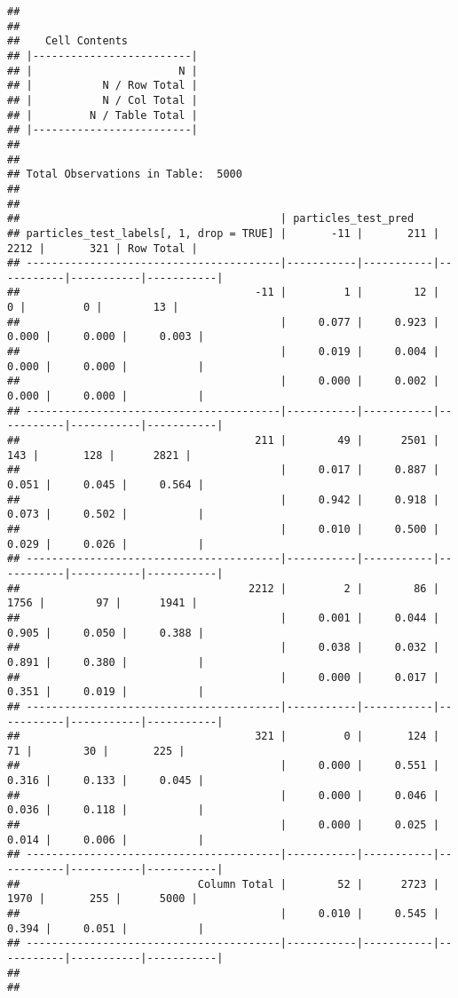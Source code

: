 \documentclass[
]{article}
\begin{document}
\begin{verbatim}
## 
##  
##    Cell Contents
## |-------------------------|
## |                       N |
## |           N / Row Total |
## |           N / Col Total |
## |         N / Table Total |
## |-------------------------|
## 
##  
## Total Observations in Table:  5000 
## 
##  
##                                         | particles_test_pred 
## particles_test_labels[, 1, drop = TRUE] |       -11 |       211 |      2212 |       321 | Row Total | 
## ----------------------------------------|-----------|-----------|-----------|-----------|-----------|
##                                     -11 |         1 |        12 |         0 |         0 |        13 | 
##                                         |     0.077 |     0.923 |     0.000 |     0.000 |     0.003 | 
##                                         |     0.019 |     0.004 |     0.000 |     0.000 |           | 
##                                         |     0.000 |     0.002 |     0.000 |     0.000 |           | 
## ----------------------------------------|-----------|-----------|-----------|-----------|-----------|
##                                     211 |        49 |      2501 |       143 |       128 |      2821 | 
##                                         |     0.017 |     0.887 |     0.051 |     0.045 |     0.564 | 
##                                         |     0.942 |     0.918 |     0.073 |     0.502 |           | 
##                                         |     0.010 |     0.500 |     0.029 |     0.026 |           | 
## ----------------------------------------|-----------|-----------|-----------|-----------|-----------|
##                                    2212 |         2 |        86 |      1756 |        97 |      1941 | 
##                                         |     0.001 |     0.044 |     0.905 |     0.050 |     0.388 | 
##                                         |     0.038 |     0.032 |     0.891 |     0.380 |           | 
##                                         |     0.000 |     0.017 |     0.351 |     0.019 |           | 
## ----------------------------------------|-----------|-----------|-----------|-----------|-----------|
##                                     321 |         0 |       124 |        71 |        30 |       225 | 
##                                         |     0.000 |     0.551 |     0.316 |     0.133 |     0.045 | 
##                                         |     0.000 |     0.046 |     0.036 |     0.118 |           | 
##                                         |     0.000 |     0.025 |     0.014 |     0.006 |           | 
## ----------------------------------------|-----------|-----------|-----------|-----------|-----------|
##                            Column Total |        52 |      2723 |      1970 |       255 |      5000 | 
##                                         |     0.010 |     0.545 |     0.394 |     0.051 |           | 
## ----------------------------------------|-----------|-----------|-----------|-----------|-----------|
## 
## 
\end{verbatim}
\end{document}
